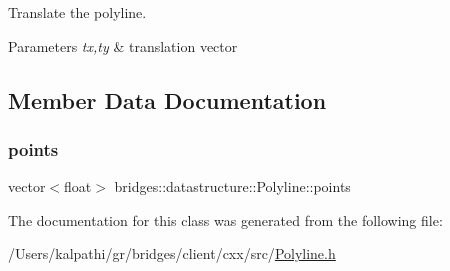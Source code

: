 Translate the polyline. 


\begin{DoxyParams}{Parameters}
{\em tx,ty} & translation vector \\
\hline
\end{DoxyParams}


\subsection{Member Data Documentation}
\mbox{\label{classbridges_1_1datastructure_1_1_polyline_a0df21b6c3cc82930a93a495de5affda7}} 
\subsubsection{\texorpdfstring{points}{points}}
{\footnotesize\ttfamily vector$<$float$>$ bridges\+::datastructure\+::\+Polyline\+::points\hspace{0.3cm}{\ttfamily [protected]}}



The documentation for this class was generated from the following file\+:\begin{DoxyCompactItemize}
\item 
/\+Users/kalpathi/gr/bridges/client/cxx/src/\mbox{\hyperlink{_polyline_8h}{Polyline.\+h}}\end{DoxyCompactItemize}
